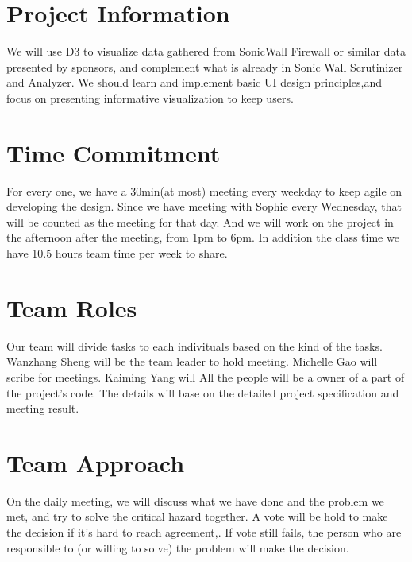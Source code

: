 \documentclass[paper=a4, fontsize=11pt]{scrartcl} %
\begin{document}
\maketitle %

\section{Project Information} %
\label{sec:project_information}
We will use D3 to visualize data gathered from SonicWall Firewall or similar data presented by sponsors, and complement what is already in Sonic Wall Scrutinizer and Analyzer. We should learn and implement basic UI design principles,and focus on presenting informative visualization to keep users.

\section{Time Commitment} %
\label{sec:time_commitment}
For every one, we have a 30min(at most) meeting every weekday to keep agile on developing the design.
Since we have meeting with Sophie every Wednesday, that will be counted as the meeting for that day.
And we will work on the project in the afternoon after the meeting, from 1pm to 6pm.
In addition the class time we have 10.5 hours team time per week to share.

\section{Team Roles} %
\label{sec:team_roles}
Our team will divide tasks to each indivituals based on the kind of the tasks.
Wanzhang Sheng will be the team leader to hold meeting.
Michelle Gao will scribe for meetings.
Kaiming Yang will
All the people will be a owner of a part of the project's code.
The details will base on the detailed project specification and meeting result.

\section{Team Approach} %
\label{sec:team_approach}
On the daily meeting, we will discuss what we have done and the problem we met, and try to solve the critical hazard together.  A vote will be hold to make the decision if it's hard to reach agreement,. If vote still fails, the person who are responsible to (or willing to solve) the problem will make the decision.
\end{document}
